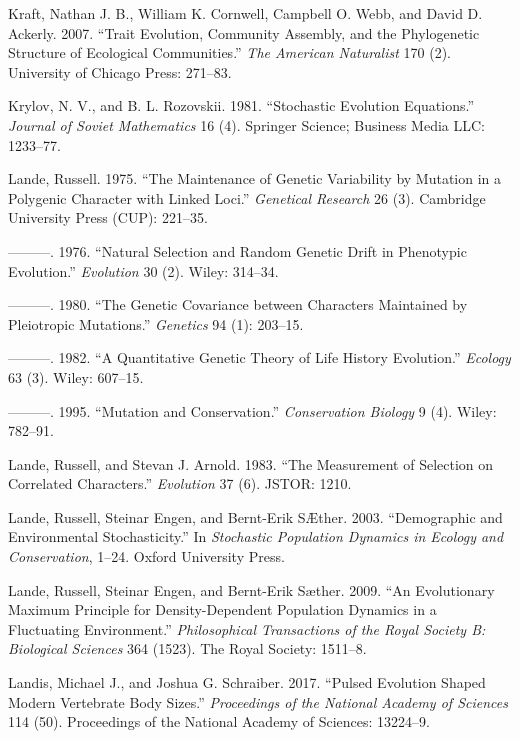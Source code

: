 \documentclass[]{article}
\begin{document}
\leavevmode\hypertarget{ref-Kraft2007}{}%
Kraft, Nathan J. B., William K. Cornwell, Campbell O. Webb, and David D.
Ackerly. 2007. ``Trait Evolution, Community Assembly, and the
Phylogenetic Structure of Ecological Communities.'' \emph{The American
Naturalist} 170 (2). University of Chicago Press: 271--83.

\leavevmode\hypertarget{ref-Krylov1981}{}%
Krylov, N. V., and B. L. Rozovskii. 1981. ``Stochastic Evolution
Equations.'' \emph{Journal of Soviet Mathematics} 16 (4). Springer
Science; Business Media LLC: 1233--77.

\leavevmode\hypertarget{ref-Lande1975}{}%
Lande, Russell. 1975. ``The Maintenance of Genetic Variability by
Mutation in a Polygenic Character with Linked Loci.'' \emph{Genetical
Research} 26 (3). Cambridge University Press (CUP): 221--35.

\leavevmode\hypertarget{ref-Lande1976}{}%
---------. 1976. ``Natural Selection and Random Genetic Drift in
Phenotypic Evolution.'' \emph{Evolution} 30 (2). Wiley: 314--34.

\leavevmode\hypertarget{ref-pmid17248993}{}%
---------. 1980. ``The Genetic Covariance between Characters Maintained
by Pleiotropic Mutations.'' \emph{Genetics} 94 (1): 203--15.

\leavevmode\hypertarget{ref-Lande1982}{}%
---------. 1982. ``A Quantitative Genetic Theory of Life History
Evolution.'' \emph{Ecology} 63 (3). Wiley: 607--15.

\leavevmode\hypertarget{ref-Lande1995}{}%
---------. 1995. ``Mutation and Conservation.'' \emph{Conservation
Biology} 9 (4). Wiley: 782--91.

\leavevmode\hypertarget{ref-Lande1983}{}%
Lande, Russell, and Stevan J. Arnold. 1983. ``The Measurement of
Selection on Correlated Characters.'' \emph{Evolution} 37 (6). JSTOR:
1210.

\leavevmode\hypertarget{ref-Lande2003}{}%
Lande, Russell, Steinar Engen, and Bernt-Erik SÆther. 2003.
``Demographic and Environmental Stochasticity.'' In \emph{Stochastic
Population Dynamics in Ecology and Conservation}, 1--24. Oxford
University Press.

\leavevmode\hypertarget{ref-Lande2009}{}%
Lande, Russell, Steinar Engen, and Bernt-Erik Sæther. 2009. ``An
Evolutionary Maximum Principle for Density-Dependent Population Dynamics
in a Fluctuating Environment.'' \emph{Philosophical Transactions of the
Royal Society B: Biological Sciences} 364 (1523). The Royal Society:
1511--8.

\leavevmode\hypertarget{ref-Landis2017}{}%
Landis, Michael J., and Joshua G. Schraiber. 2017. ``Pulsed Evolution
Shaped Modern Vertebrate Body Sizes.'' \emph{Proceedings of the National
Academy of Sciences} 114 (50). Proceedings of the National Academy of
Sciences: 13224--9.
\end{document}
